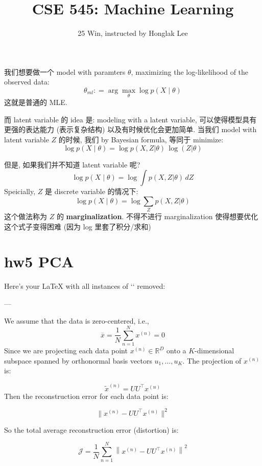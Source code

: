 \documentclass[lang=cn,11pt]{elegantbook}
\title{CSE 545: Machine Learning}
\subtitle{25 Win, instructed by Honglak Lee}
\begin{document}
\frontmatter
\tableofcontents
\mainmatter


我们想要做一个 model with paramters $\theta$, maximizing the log-likelihood of the observed data:
$$
\theta_{ml} : =   \arg \max_{\theta} \log p(X \mid\theta ) 
$$
这就是普通的 MLE.

而 latent variable 的 idea 是: modeling with a latent variable, 可以使得模型具有更强的表达能力 (表示复杂结构) 以及有时候优化会更加简单.
当我们 model with latent variable $Z$ 的时候, 我们 by Bayesian formula, 等同于 minimize: 
$$
\log p(X \mid\theta )  = \log  p(X, Z |\theta )   \, \log (Z  |  \theta)
$$

但是, 如果我们并不知道 latent variable 呢?
$$
\log p(X \mid\theta ) = \log  \int  p(X, Z |\theta ) \, dZ
$$
Speicially, $Z$ 是 discrete variable 的情况下: \[
\log p(X \mid\theta ) =  \log   \sum_Z p(X, Z |\theta ) 
\]
这个做法称为 $Z$ 的 \textbf{marginalization}. 不得不进行 marginalization 使得想要优化这个式子变得困难 (因为 log 里套了积分/求和)









\section{hw5 PCA}

Here's your LaTeX with all instances of `\mathbf` removed:

---

We assume that the data is zero-centered, i.e.,  
\[
\overline{x} = \frac{1}{N} \sum_{n=1}^N x^{(n)} = 0
\]
Since we are projecting each data point \(x^{(n)} \in \mathbb{R}^D\) onto a \(K\)-dimensional subspace spanned by orthonormal basis vectors \(u_1, \dots, u_K\). The projection of \(x^{(n)}\) is:

\[
\widetilde{x}^{(n)} = UU^\top x^{(n)}
\]
Then the reconstruction error for each data point is:

\[
\|x^{(n)} - UU^\top x^{(n)}\|^2
\]

So the total average reconstruction error (distortion) is:

\[
\mathcal{J} = \frac{1}{N} \sum_{n=1}^N \left\|x^{(n)} - UU^\top x^{(n)}\right\|^2
\]
\end{document}
